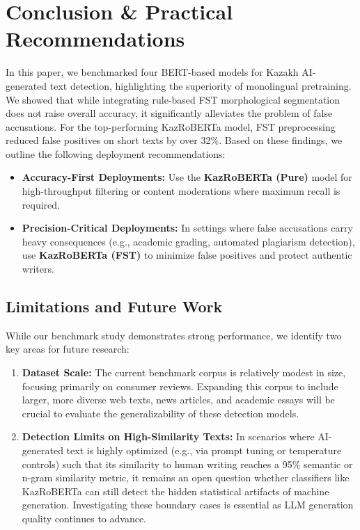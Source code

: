 \documentclass[runningheads]{llncs}
\begin{document}
\section{Conclusion \& Practical Recommendations}
In this paper, we benchmarked four BERT-based models for Kazakh AI-generated text detection, highlighting the superiority of monolingual pretraining. We showed that while integrating rule-based FST morphological segmentation does not raise overall accuracy, it significantly alleviates the problem of false accusations. For the top-performing KazRoBERTa model, FST preprocessing reduced false positives on short texts by over 32\%.
Based on these findings, we outline the following deployment recommendations:
\begin{itemize}
\item \textbf{Accuracy-First Deployments:} Use the \textbf{KazRoBERTa (Pure)} model for high-throughput filtering or content moderations where maximum recall is required.
\item \textbf{Precision-Critical Deployments:} In settings where false accusations carry heavy consequences (e.g., academic grading, automated plagiarism detection), use \textbf{KazRoBERTa (FST)} to minimize false positives and protect authentic writers.
\end{itemize}

\subsection{Limitations and Future Work}
While our benchmark study demonstrates strong performance, we identify two key areas for future research:
\begin{enumerate}
\item \textbf{Dataset Scale:} The current benchmark corpus is relatively modest in size, focusing primarily on consumer reviews. Expanding this corpus to include larger, more diverse web texts, news articles, and academic essays will be crucial to evaluate the generalizability of these detection models.
\item \textbf{Detection Limits on High-Similarity Texts:} In scenarios where AI-generated text is highly optimized (e.g., via prompt tuning or temperature controls) such that its similarity to human writing reaches a 95\% semantic or n-gram similarity metric, it remains an open question whether classifiers like KazRoBERTa can still detect the hidden statistical artifacts of machine generation. Investigating these boundary cases is essential as LLM generation quality continues to advance.
\end{enumerate}
\end{document}
